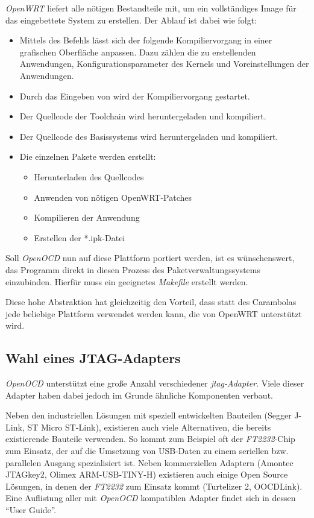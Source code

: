 \emph{OpenWRT} liefert alle nötigen Bestandteile mit, um ein vollständiges Image
für das eingebettete System zu erstellen.
Der Ablauf ist dabei wie folgt:
\begin{itemize}
  \item Mittels des Befehls  lässt sich der folgende
  Kompiliervorgang in einer grafischen Oberfläche anpassen. Dazu zählen die zu
  erstellenden Anwendungen, Konfigurationsparameter des Kernels und
  Voreinstellungen der Anwendungen.
  \item Durch das Eingeben von  wird der Kompiliervorgang
  gestartet.
  \item Der Quellcode der Toolchain wird heruntergeladen und kompiliert.
  \item Der Quellcode des Basissystems wird heruntergeladen und kompiliert.
  \item Die einzelnen Pakete werden erstellt:
  \begin{itemize}
    \item Herunterladen des Quellcodes
    \item Anwenden von nötigen OpenWRT-Patches
    \item Kompilieren der Anwendung
    \item Erstellen der *.ipk-Datei
  \end{itemize}
\end{itemize}

Soll \emph{OpenOCD} nun auf diese Plattform portiert werden, ist es wünschenswert,
das Programm direkt in diesen Prozess des Paketverwaltungssystems einzubinden.
Hierfür muss ein geeignetes \emph{Makefile} erstellt werden.

Diese hohe Abstraktion hat gleichzeitig den Vorteil, dass statt des Carambolas
jede beliebige Plattform verwendet werden kann, die von OpenWRT unterstützt
wird.

\subsection{Wahl eines JTAG-Adapters}
\emph{OpenOCD} unterstützt eine große Anzahl verschiedener \emph{\gls{jtag}-Adapter}.
Viele dieser Adapter haben dabei jedoch im Grunde ähnliche Komponenten verbaut.

Neben den industriellen Lösungen mit speziell entwickelten Bauteilen (Segger
J-Link\cite{SEG}, ST Micro ST-Link\cite{STM01}), existieren auch viele
Alternativen, die bereits existierende Bauteile verwenden. So kommt zum Beispiel oft der
\emph{FT2232}-Chip zum Einsatz, der auf die Umsetzung von USB-Daten zu einem
seriellen bzw. parallelen Ausgang spezialisiert ist. Neben kommerziellen
Adaptern (Amontec JTAGkey2\cite{AMO}, Olimex ARM-USB-TINY-H\cite{OLI})
existieren auch einige Open Source Lösungen, in denen der \emph{FT2232} zum
Einsatz kommt (Turtelizer 2\cite{TURT}, OOCDLink\cite{OCDL}). Eine
Auflistung aller mit \emph{OpenOCD} kompatiblen Adapter findet sich in dessen "`User Guide"'\cite{OOCD}.

